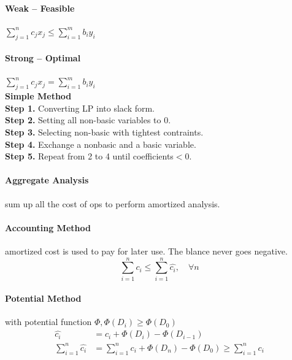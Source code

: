 \documentclass[a4paper]{article}
\begin{document}
\begin{multicols}{2}
\begin{tcolorbox}[title=Linear Programming]
    \paragraph{Weak -- Feasible} $\sum_{j=1}^n c_jx_j\leq \sum_{i=1}^m b_iy_i$
    \paragraph{Strong -- Optimal} $\sum_{j=1}^n c_jx_j= \sum_{i=1}^m b_iy_i$\\
    \textbf{Simple Method}\\
    \textbf{Step 1.} Converting LP into slack form.\\
    \textbf{Step 2.} Setting all non-basic variables to 0.\\
    \textbf{Step 3.} Selecting non-basic with tightest contraints.\\
    \textbf{Step 4.} Exchange a nonbasic and a basic variable.\\
    \textbf{Step 5.} Repeat from 2 to 4 until coefficients$<0$.
\end{tcolorbox}

\begin{tcolorbox}[title=Amortized Analysis]
    \paragraph{Aggregate Analysis} sum up all the cost of ops to perform amortized analysis.
    \paragraph{Accounting Method} amortized cost is used to pay for later use. The blance never goes negative.
    \begin{equation*}
        \sum_{i=1}^n c_i \leq \sum_{i=1}^n \hat{c_i}, \quad \forall n
    \end{equation*}
    \paragraph{Potential Method} with potential function $\Phi,\Phi(D_i)\geq \Phi(D_0)$
    \begin{align*}
        \hat{c_i} &= c_i + \Phi(D_i) - \Phi(D_{i-1}) \\
        \sum_{i=1}^n \hat{c_i} &= \sum_{i=1}^n c_i + \Phi(D_n) - \Phi(D_0)\geq  \sum_{i=1}^n c_i
    \end{align*}
\end{tcolorbox}


\end{multicols}
\end{document}

